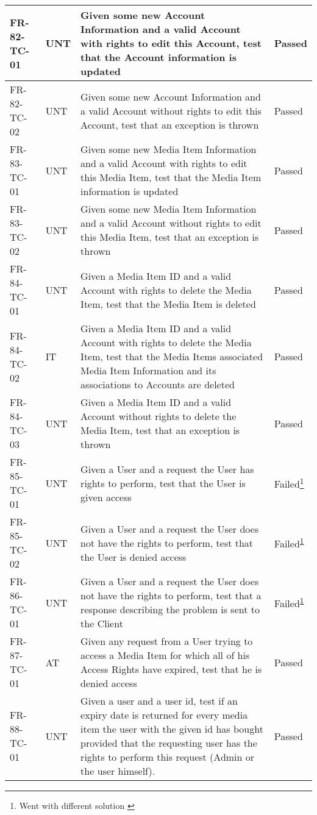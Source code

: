 \documentclass[../report.tex]{subfiles}
\newcommand{\footnoteref}[1]{\textsuperscript{\ref{#1}}}
\begin{document}
\begin{longtable}{|L{2.1cm}|L{1cm}|L{12.4cm}|L{1.4cm}|}
FR-82-TC-01&UNT&Given some new Account Information and a valid Account with rights to edit this Account, test that the Account information is updated&Passed  \\ \hline
FR-82-TC-02&UNT&Given some new Account Information and a valid Account without rights to edit this Account, test that an exception is thrown&Passed  \\ \hline
FR-83-TC-01&UNT&Given some new Media Item Information and a valid Account with rights to edit this Media Item, test that the Media Item information is updated&Passed  \\ \hline
FR-83-TC-02&UNT&Given some new Media Item Information and a valid Account without rights to edit this Media Item, test that an exception is thrown&Passed  \\ \hline
FR-84-TC-01&UNT&Given a Media Item ID and a valid Account with rights to delete the Media Item, test that the Media Item is deleted&Passed  \\ \hline
FR-84-TC-02&IT&Given a Media Item ID and a valid Account with rights to delete the Media Item, test that the Media Items associated Media Item Information and its associations to Accounts are deleted&Passed  \\ \hline
FR-84-TC-03&UNT&Given a Media Item ID and a valid Account without rights to delete the Media Item, test that an exception is thrown&Passed  \\ \hline
FR-85-TC-01&UNT&Given a User and a request the User has rights to perform, test that the User is given access &Failed\footnote{Went with different solution \label{note2}}  \\ \hline
FR-85-TC-02&UNT&Given a User and a request the User does not have the rights to perform, test that the User is denied access&Failed\footnoteref{note2}  \\ \hline
FR-86-TC-01&UNT&Given a User and a request the User does not have the rights to perform, test that a response describing the problem is sent to the Client&Failed\footnoteref{note2}  \\ \hline
FR-87-TC-01&AT&Given any request from a User trying to access a Media Item for which all of his Access Rights have expired, test that he is denied access&Passed  \\ \hline
FR-88-TC-01&UNT&Given a user and a user id, test if an expiry date is returned for every media item the user with the given id has bought provided that the requesting user has the rights to perform this request (Admin or the user himself).&Passed  \\ \hline

\end{longtable}
\end{document}
